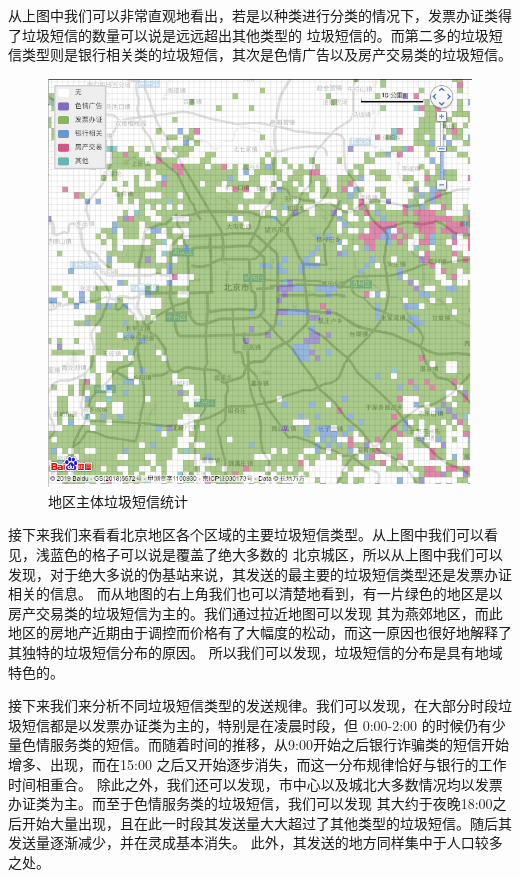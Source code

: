 \documentclass[12pt,a4paper]{article}
\begin{document}
\begin{itemize}
	从上图中我们可以非常直观地看出，若是以种类进行分类的情况下，发票办证类得了垃圾短信的数量可以说是远远超出其他类型的
	垃圾短信的。而第二多的垃圾短信类型则是银行相关类的垃圾短信，其次是色情广告以及房产交易类的垃圾短信。

	\begin{flushleft}
		\begin{figure}[H]
			\centering
				\includegraphics[width=\linewidth]{full.png}
				\caption{地区主体垃圾短信统计}
		\end{figure}
	\end{flushleft}

	接下来我们来看看北京地区各个区域的主要垃圾短信类型。从上图中我们可以看见，浅蓝色的格子可以说是覆盖了绝大多数的
	北京城区，所以从上图中我们可以发现，对于绝大多说的伪基站来说，其发送的最主要的垃圾短信类型还是发票办证相关的信息。
	而从地图的右上角我们也可以清楚地看到，有一片绿色的地区是以房产交易类的垃圾短信为主的。我们通过拉近地图可以发现
	其为燕郊地区，而此地区的房地产近期由于调控而价格有了大幅度的松动，而这一原因也很好地解释了其独特的垃圾短信分布的原因。
	所以我们可以发现，垃圾短信的分布是具有地域特色的。

	接下来我们来分析不同垃圾短信类型的发送规律。我们可以发现，在大部分时段垃圾短信都是以发票办证类为主的，特别是在凌晨时段，但
	0:00-2:00 的时候仍有少量色情服务类的短信。而随着时间的推移，从9:00开始之后银行诈骗类的短信开始增多、出现，而在15:00
	之后又开始逐步消失，而这一分布规律恰好与银行的工作时间相重合。
	除此之外，我们还可以发现，市中心以及城北大多数情况均以发票办证类为主。而至于色情服务类的垃圾短信，我们可以发现
	其大约于夜晚18:00之后开始大量出现，且在此一时段其发送量大大超过了其他类型的垃圾短信。随后其发送量逐渐减少，并在灵成基本消失。
	此外，其发送的地方同样集中于人口较多之处。


\end{itemize}
\end{document}
